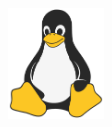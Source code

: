 \documentclass[letterpaper,12pt]{exam}
\begin{document}
\begin{figure}[b]\label{end}
	\center
	\includegraphics[width=1in]{tux}
	{}
\end{figure}
\end{document}
